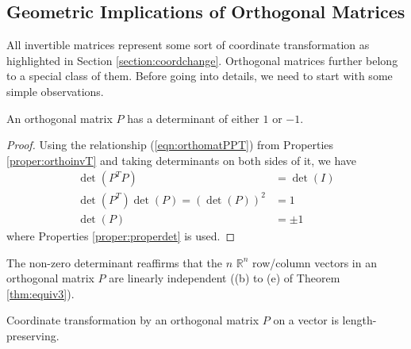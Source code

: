 \subsection{Geometric Implications of Orthogonal Matrices}
\label{section:orthogeometricsub}
All invertible matrices represent some sort of coordinate transformation as highlighted in Section \ref{section:coordchange}. Orthogonal matrices further belong to a special class of them. Before going into details, we need to start with some simple observations.
\begin{proper}
\label{proper:orthopm1det}
An orthogonal matrix $P$ has a determinant of either $1$ or $-1$.
\end{proper}
\begin{proof}
Using the relationship (\ref{eqn:orthomatPPT}) from Properties \ref{proper:orthoinvT} and taking determinants on both sides of it, we have
\begin{align*}
\det(P^TP) &= \det(I) \\
\det(P^T)\det(P) = (\det(P))^2 &= 1\\
\det(P) &= \pm 1
\end{align*}
where Properties \ref{proper:properdet} is used.    
\end{proof} 
The non-zero determinant reaffirms that the $n$ $\mathbb{R}^n$ row/column vectors in an orthogonal matrix $P$ are linearly independent ((b) to (e) of Theorem \ref{thm:equiv3}). 
\begin{proper}
\label{proper:ortholengthpreserve}
Coordinate transformation by an orthogonal matrix $P$ on a vector is length-preserving.
\end{proper}
